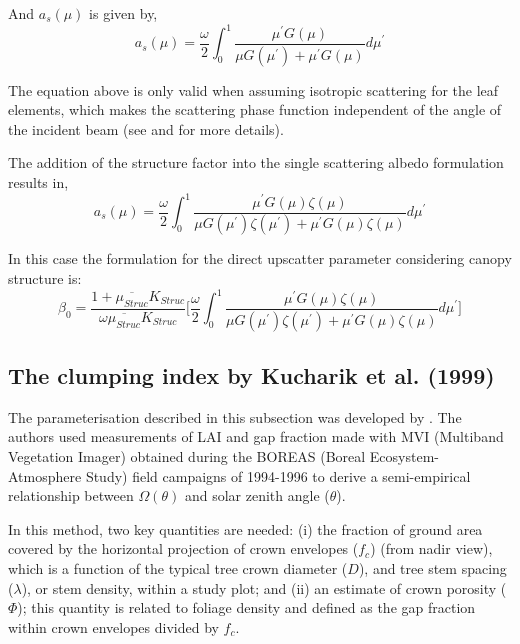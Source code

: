\documentclass[a4paper,11pt]{report}
\begin{document}
And $a_s(\mu)$ is given by, 
\begin{equation}
a_s(\mu) = \frac{\omega}{2}\int_{0}^{1} \frac{\mu^\prime G(\mu)}{\mu G(\mu^\prime) + \mu^\prime G(\mu)} d\mu^\prime
\label{equation:alphas}
\end{equation}

The equation above is only valid when assuming isotropic scattering for the leaf elements, which makes the scattering phase function independent of the angle of the incident beam (see \citet{Dickinson1983} and \citet{Sellers1985} for more details). 

The addition of the structure factor into the single scattering albedo formulation results in,
\begin{equation}
a_s(\mu) = \frac{\omega}{2}\int_{0}^{1} \frac{\mu^\prime G(\mu) \zeta(\mu)}{\mu G(\mu^\prime) \zeta(\mu^\prime) + \mu^\prime G(\mu)\zeta(\mu)} d\mu^\prime
\label{equation:alphasstruct}
\end{equation}

In this case the formulation for the direct upscatter parameter considering canopy structure is: 
\begin{equation}
\beta_0 = \frac{1 + \overline{\mu_{Struc}}K_{Struc}}{\omega\overline{\mu_{Struc}}K_{Struc}}
\bigg[\frac{\omega}{2}\int_{0}^{1} \frac{\mu^\prime G(\mu) \zeta(\mu)}{\mu G(\mu^\prime) \zeta(\mu^\prime) + \mu^\prime G(\mu)\zeta(\mu)} d\mu^\prime \bigg]
\label{equation:alphasstruct}
\end{equation}

\subsection{The clumping index by Kucharik et al. (1999)}
The parameterisation described in this subsection was developed by \citet{Kucharik1999}. The authors used measurements of LAI and gap fraction made with MVI (Multiband Vegetation Imager) \citep{Kucharik1997} obtained during the BOREAS (Boreal Ecosystem-Atmosphere Study) \citep{Sellers1997} field campaigns of 1994-1996 to derive a semi-empirical relationship between $\Omega(\theta)$ and solar zenith angle ($\theta$). 

In this method, two key quantities are needed: (i) the fraction of ground area covered by the horizontal projection of crown envelopes ($f_c$) (from nadir view), which is a function of the typical tree crown diameter ($D$), and tree stem spacing ($\lambda$), or stem density, within a study plot; and (ii) an estimate of crown porosity ($\Phi$); this quantity is related to foliage density and defined as the gap fraction within crown envelopes divided by $f_c$.
 
\end{document}
